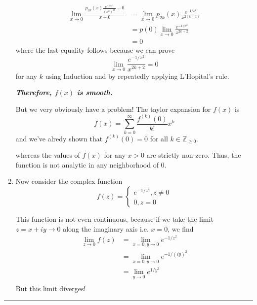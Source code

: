 \documentclass{article}
\begin{document}
\begin{enumerate}[label=(\alph*)]
  \begin{align*}
    \lim_{x \rightarrow 0} \frac{ p_{2k}(x) \frac{e^{-1/x^2}}{(x^2)^{2k}} - 0}{x - 0} &= \lim_{x \rightarrow 0} p_{2k}(x) \frac{e^{-1/x^2}}{x^{2(k+1)}} \\
    &= p(0) \lim_{x \rightarrow 0} \frac{e^{-1/x^2}}{x^{2k+2}} \\
    &= 0
  \end{align*}
  where the last equality follows because we can prove 
  \[ \lim_{x \rightarrow 0} \frac{e^{-1/x^2}}{x^{2k+2}} = 0 \]
  for any $k$ using Induction and by repeatedly applying L'Hopital's rule.
  
  \vskip 0.5cm
  \emph{\textbf{Therefore, $f(x)$ is smooth.}}

  \vskip 0.5cm 
  But we very obviously have a problem! The taylor expansion for $f(x)$ is 
  \[ f(x) = \sum_{k = 0}^{\infty} \frac{f^{(k)}(0)}{k!} x^k \]
  and we've alredy shown that $f^{(k)}(0) = 0$ for all $k \in \mathbb{Z}_{\geq 0}$.

  whereas the values of $f(x)$ for any $x > 0$ are strictly non-zero. Thus, the function is not analytic in any neighborhood of $0$.

  \vskip 0.5cm
  \item Now consider the complex function 
  \[ f(z) = \begin{cases}
    e^{-1/z^2}, z \neq 0 \\
    0, z = 0
  \end{cases} \]

  This function is not even continuous, because if we take the limit $z = x + iy \rightarrow 0$ along the imaginary axis i.e. $x = 0$, we find 
  \begin{align*}
    \lim_{z \rightarrow 0} f(z) &= \lim_{x = 0, y \rightarrow 0} e^{-1/z^2}  \\
    &= \lim_{x = 0, y \rightarrow 0} e^{-1/(iy)^2} \\
    &= \lim_{y \rightarrow 0} e^{1/y^2} \\
  \end{align*}
  But this limit diverges!
\end{enumerate}



\vskip 0.5cm
\hrule 
\vskip 0.5cm






\end{document}
